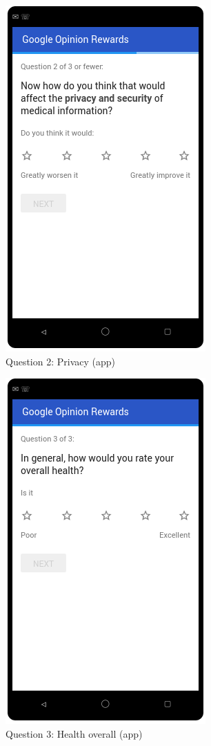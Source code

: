 \begin{figure}
	\includegraphics{Selection_362.png}
	\caption{\label{fig:app:q2}Question 2: Privacy (app)}
\end{figure}
\begin{figure}
	\includegraphics{Selection_363.png}
	\caption{\label{fig:app:q3}Question 3: Health overall (app)}
\end{figure}


